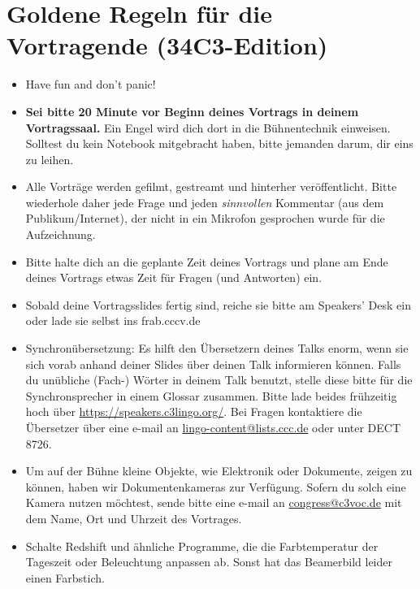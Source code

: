 \documentclass[paper=a4]{scrartcl}
\begin{document}
\section*{Goldene Regeln für die Vortragende (34C3-Edition)}
\begin{itemize}
	\item Have fun and don't panic!
	\item \textbf{Sei bitte 20 Minute vor Beginn deines Vortrags in deinem Vortragssaal.} Ein Engel wird dich dort in die Bühnentechnik einweisen. Solltest du kein Notebook mitgebracht haben, bitte jemanden darum, dir eins zu leihen.
	\item Alle Vorträge werden gefilmt, gestreamt und hinterher veröffentlicht. Bitte wiederhole daher jede Frage und jeden \textit{sinnvollen} Kommentar (aus dem Publikum/Internet), der nicht in ein Mikrofon gesprochen wurde für die Aufzeichnung.
	\item Bitte halte dich an die geplante Zeit deines Vortrags und plane am Ende deines Vortrags etwas Zeit für Fragen (und Antworten) ein.
	\item Sobald deine Vortragsslides fertig sind, reiche sie bitte am Speakers' Desk ein oder lade sie selbst ins frab.cccv.de
	\item Synchronübersetzung: Es hilft den Übersetzern deines Talks enorm, wenn sie sich vorab anhand deiner Slides über deinen Talk informieren können. Falls du unübliche (Fach-\nobreak) Wörter in deinem Talk benutzt, stelle diese bitte für die Synchronsprecher in einem Glossar zusammen. Bitte lade beides frühzeitig hoch über \url{https://speakers.c3lingo.org/}. Bei Fragen kontaktiere die Übersetzer über eine e-mail an \url{lingo-content@lists.ccc.de} oder unter DECT 8726.
	\item Um auf der Bühne kleine Objekte, wie Elektronik oder Dokumente, zeigen zu können, haben wir Dokumentenkameras zur Verfügung. Sofern du solch eine Kamera nutzen möchtest, sende bitte eine e-mail an \url{congress@c3voc.de} mit dem Name, Ort und Uhrzeit des Vortrages.
	\item Schalte Redshift und ähnliche Programme, die die Farbtemperatur der Tageszeit oder Beleuchtung anpassen ab. Sonst hat das Beamerbild leider einen Farbstich.
\end{itemize}
\end{document}
